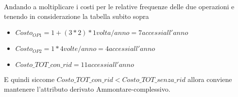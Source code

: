 Andando a moltiplicare i costi per le relative frequenze delle due operazioni e tenendo in considerazione la tabella subito sopra

\begin{samepage}
	\begin{itemize}
		\item $Costo_{OP1} = 1 + (3 * 2) * 1 volta/anno = 7 accessi all'anno$
		\item $Costo_{OP2} = 1 * 4 volte/anno = 4 accessi all'anno$
		\item $Costo\_TOT\_con\_rid = 11 accessi all'anno$
	\end{itemize}
\end{samepage}

E quindi siccome $Costo\_TOT\_con\_rid < Costo\_TOT\_senza\_rid$ allora conviene mantenere l'attributo derivato Ammontare-complessivo.

